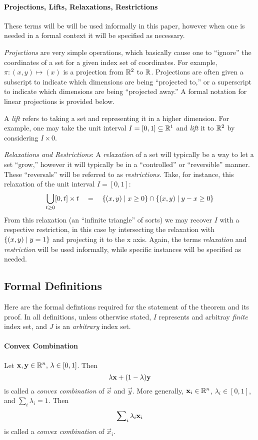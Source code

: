 \paragraph{Projections, Lifts, Relaxations, Restrictions}  These terms will be will be used informally in this paper, however when one is needed in a formal context it will be specified as necessary.  

\textit{Projections} are very simple operations, which basically cause one to ``ignore'' the coordinates of a set for a given index set of coordinates.  For example, $\pi: (x,y) \mapsto (x)$ is a projection from $\mathbb{R}^2$ to $\mathbb{R}$.  Projections are often given a subscript to indicate which dimensions are being ``projected to,'' or a superscript to indicate which dimensions are being ``projected away.''  A formal notation for linear projections is provided below.

A \textit{lift} refers to taking a set and representing it in a higher dimension.  For example, one may take the unit interval $I = [0,1] \subseteq \mathbb{R}^1$ and \textit{lift} it to $\mathbb{R}^2$ by considering $I \times {0}$.  

\textit{Relaxations and Restrictions}: A \textit{relaxation} of a set will typically be a way to let a set ``grow,'' however it will typically be in a ``controlled'' or ``reversible'' manner.  These ``reversals'' will be referred to as \textit{restrictions}.  Take, for instance, this relaxation of the unit interval $I = [0,1]$: 
  \[\bigcup_{t \geq 0} [0,t]\times t \quad=\quad 
    \{(x,y) \;|\; x \geq 0\} \cap \{(x,y) \;|\; y - x \geq 0\}\]  
From this relaxation (an ``infinite triangle'' of sorts) we may recover $I$ with a respective restriction, in this case by intersecting the relaxation with ${\{(x,y) \;|\; y = 1\}}$ and projecting it to the x axis.  Again, the terms \textit{relaxation} and \textit{restriction} will be used informally, while specific instances will be specified as needed.


\subsection{Formal Definitions}
Here are the formal defintions required for the statement of the theorem and its proof.  In all definitions, unless otherwise stated, $I$ represents and arbitray \textit{finite} index set, and $J$ is an \textit{arbitrary} index set.

\paragraph{Convex Combination} 
Let $\mathbf{x},\mathbf{y} \in \mathbb{R}^n,\, \lambda \in [0,1]$.  Then
  \[\lambda \mathbf{x} + (1-\lambda) \mathbf{y}\]
is called a \textit{convex combination} of $\vec{x}$ and $\vec{y}$.
More generally, $\mathbf{x}_i \in \mathbb{R}^n$, $\lambda_i \in [0,1]$, and $\sum_i \lambda_i = 1$.  Then 
  \[\sum\nolimits_{i} \lambda_{i} \mathbf{x}_{i}\]
is called a \textit{convex combination} of $\vec{x}_i$.

